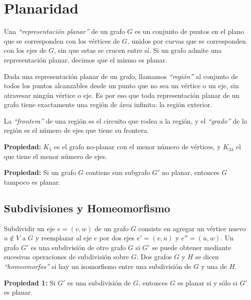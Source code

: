 \newpage
\section{Planaridad}

Una \emph{``representaci\'on planar''} de un grafo $G$ es un conjunto de puntos en el plano que se corresponden con los v\'ertices de $G$, unidos por curvas que se corresponden con los ejes de $G$, sin que estas se crucen entre s\'i. Si un grafo admite una representaci\'on planar, decimos que el mismo es planar.

Dada una representaci\'on planar de un grafo, llamamos \emph{``regi\'on''} al conjunto de todos los puntos alcanzables desde un punto que no sea un v\'ertice o un eje, sin atravesar ning\'un v\'ertice o eje. Es por eso que toda representaci\'on planar de un grafo tiene exactamente una regi\'on de \'area infinita: la regi\'on exterior.

La \emph{``frontera''} de una regi\'on es el circuito que rodea a la regi\'on, y el \emph{``grado''} de la regi\'on es el n\'umero de ejes que tiene su frontera.

\begin{badidea}
\textbf{Propiedad:} $K_5$ es el grafo no-planar con el menor n\'umero de v\'ertices, y $K_{33}$ el que tiene el menor n\'umero de ejes.
\end{badidea}

\begin{badidea}
\textbf{Propiedad:} Si un grafo $G$ contiene sun subgrafo $G'$ no planar, entonces $G$ tampoco es planar.
\end{badidea}

\subsection{Subdivisiones y Homeomorfismo}

Subdividir un eje $e = (v,w)$ de un grafo $G$ consiste en agregar un v\'ertice nuevo $u \not\in V$ a $G$ y reemplazar al eje $e$ por dos ejes $e' = (v, u)$ y $e'' = (u, w)$. Un grafo $G'$ es una subdivisi\'on de otro grafo $G$ si $G'$ se puede obtener mediante sucesivas operaciones de subdivisi\'on sobre $G$. Dos grafos $G$ y $H$ se dicen \emph{``homeomorfos''} si hay un isomorfismo entre una subdivisi\'on de $G$ y una de $H$.

\begin{badidea}
\textbf{Propiedad 1:} Si $G'$ es una subdivisi\'on de $G$, entonces $G$ es planar si y s\'olo si $G'$ es planar.
\end{badidea}

